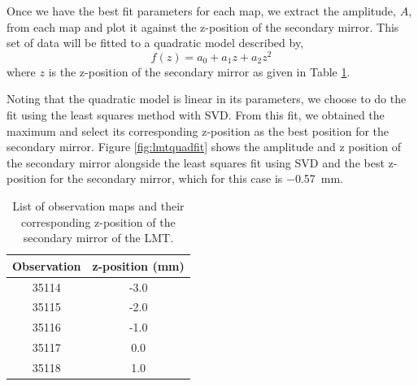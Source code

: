 Once we have the best fit parameters for each map, we extract the amplitude, $A$, from each map and plot it against the z-position of the secondary mirror. This set of data will be fitted to a quadratic model described by,
\begin{equation}
    f(z)=a_0+a_1z+a_2z^2
\end{equation}
where $z$ is the z-position of the secondary mirror as given in Table \ref{tab:LMTmaps}. 

Noting that the quadratic model is linear in its parameters, we choose to do the fit using the least squares method with SVD. From this fit, we obtained the maximum and select its corresponding z-position as the best position for the secondary mirror. Figure \ref{fig:lmtquadfit} shows the amplitude and z position of the secondary mirror alongside the least squares fit using SVD and the best z-position for the secondary mirror, which for this case is \SI{-0.57}{\milli\m}.




\begin{table}[h]
    \centering
    \begin{tabular}{|c|c|}
        \toprule
         Observation  & z-position (mm)  \\
         \midrule
         35114 & -3.0\\
         35115 & -2.0 \\
         35116 & -1.0 \\
         35117 & 0.0 \\
         35118 & 1.0\\
         \bottomrule
    \end{tabular}
    \caption{List of observation maps and their corresponding z-position of the secondary mirror of the LMT.}
    \label{tab:LMTmaps}
\end{table}

